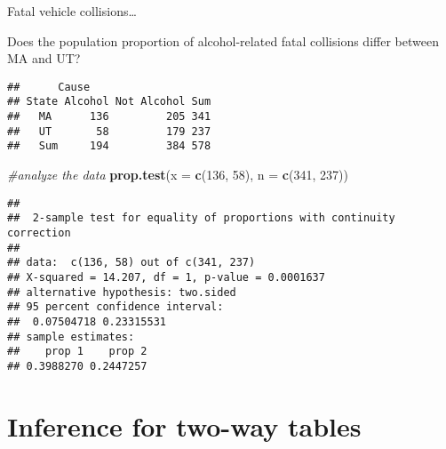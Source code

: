 \documentclass[
  ignorenonframetext,
  aspectratio=169]{beamer}
\newenvironment{Shaded}{\begin{snugshade}}{\end{snugshade}}
\newcommand{\AttributeTok}[1]{\textcolor[rgb]{0.13,0.29,0.53}{#1}}
\newcommand{\CommentTok}[1]{\textcolor[rgb]{0.56,0.35,0.01}{\textit{#1}}}
\newcommand{\DecValTok}[1]{\textcolor[rgb]{0.00,0.00,0.81}{#1}}
\newcommand{\FunctionTok}[1]{\textcolor[rgb]{0.13,0.29,0.53}{\textbf{#1}}}
\newcommand{\NormalTok}[1]{#1}
\begin{document}
\begin{frame}[fragile]{Fatal vehicle collisions\ldots{}}
\protect\hypertarget{fatal-vehicle-collisions-1}{}
\small

Does the population proportion of alcohol-related fatal collisions
differ between MA and UT?

\scriptsize

\begin{verbatim}
##      Cause
## State Alcohol Not Alcohol Sum
##   MA      136         205 341
##   UT       58         179 237
##   Sum     194         384 578
\end{verbatim}

\begin{Shaded}
\begin{Highlighting}[]
\CommentTok{\#analyze the data}
\FunctionTok{prop.test}\NormalTok{(}\AttributeTok{x =} \FunctionTok{c}\NormalTok{(}\DecValTok{136}\NormalTok{, }\DecValTok{58}\NormalTok{), }\AttributeTok{n =} \FunctionTok{c}\NormalTok{(}\DecValTok{341}\NormalTok{, }\DecValTok{237}\NormalTok{))}
\end{Highlighting}
\end{Shaded}

\begin{verbatim}
## 
##  2-sample test for equality of proportions with continuity correction
## 
## data:  c(136, 58) out of c(341, 237)
## X-squared = 14.207, df = 1, p-value = 0.0001637
## alternative hypothesis: two.sided
## 95 percent confidence interval:
##  0.07504718 0.23315531
## sample estimates:
##    prop 1    prop 2 
## 0.3988270 0.2447257
\end{verbatim}
\end{frame}

\hypertarget{inference-for-two-way-tables}{%
\section{Inference for two-way
tables}\label{inference-for-two-way-tables}}
\end{document}
